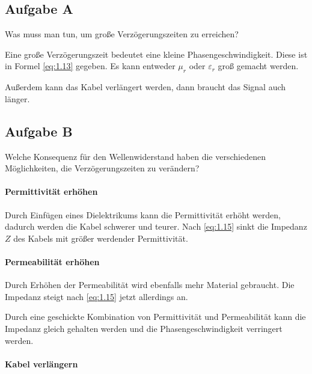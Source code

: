 \subsection{Aufgabe A}

\begin{problem}
	Was muss man tun, um große Verzögerungszeiten zu erreichen?
\end{problem}

Eine große Verzögerungszeit bedeutet eine kleine Phasengeschwindigkeit. Diese
ist in Formel \eqref{eq:1.13} gegeben. Es kann entweder $\mu_r$ oder
$\varepsilon_r$ groß gemacht werden.

Außerdem kann das Kabel verlängert werden, dann braucht das Signal auch länger.

\subsection{Aufgabe B}

\begin{problem}
	Welche Konsequenz für den Wellenwiderstand haben die verschiedenen
	Möglichkeiten, die Verzögerungszeiten zu verändern?
\end{problem}

\paragraph{Permittivität erhöhen}

Durch Einfügen eines Dielektrikums kann die Permittivität erhöht werden,
dadurch werden die Kabel schwerer und teurer. Nach \eqref{eq:1.15} sinkt die
Impedanz $Z$ des Kabels mit größer werdender Permittivität.

\paragraph{Permeabilität erhöhen}

Durch Erhöhen der Permeabilität wird ebenfalls mehr Material gebraucht. Die
Impedanz steigt nach \eqref{eq:1.15} jetzt allerdings an.

Durch eine geschickte Kombination von Permittivität und Permeabilität kann die
Impedanz gleich gehalten werden und die Phasengeschwindigkeit verringert
werden.

\paragraph{Kabel verlängern}

